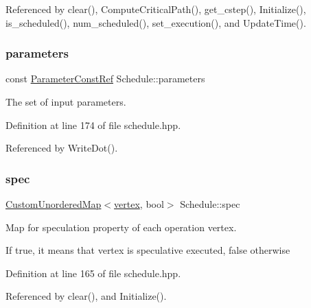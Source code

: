 Referenced by clear(), Compute\+Critical\+Path(), get\+\_\+cstep(), Initialize(), is\+\_\+scheduled(), num\+\_\+scheduled(), set\+\_\+execution(), and Update\+Time().

\mbox{\label{classSchedule_aceedbf18bb7e3a43b66df301ce21325f}} 
\subsubsection{\texorpdfstring{parameters}{parameters}}
{\footnotesize\ttfamily const \hyperlink{Parameter_8hpp_a37841774a6fcb479b597fdf8955eb4ea}{Parameter\+Const\+Ref} Schedule\+::parameters\hspace{0.3cm}{\ttfamily [private]}}



The set of input parameters. 



Definition at line 174 of file schedule.\+hpp.



Referenced by Write\+Dot().

\mbox{\label{classSchedule_adbcbb1238dd11219d751c7fd28c8b44f}} 
\subsubsection{\texorpdfstring{spec}{spec}}
{\footnotesize\ttfamily \hyperlink{custom__map_8hpp_ad1ed68f2ff093683ab1a33522b144adc}{Custom\+Unordered\+Map}$<$\hyperlink{graph_8hpp_abefdcf0544e601805af44eca032cca14}{vertex}, bool$>$ Schedule\+::spec\hspace{0.3cm}{\ttfamily [private]}}



Map for speculation property of each operation vertex. 

If true, it means that vertex is speculative executed, false otherwise 

Definition at line 165 of file schedule.\+hpp.



Referenced by clear(), and Initialize().

\mbox{\label{classSchedule_a65835449ae73c073c23aeaa59cdf799b}} 
